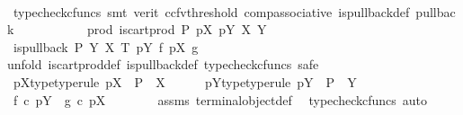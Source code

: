 \begin{isabellebody}
\ \ \ \ \ \ \ \ \isamarkupfalse%
\ {\isacharparenleft}{\kern0pt}typecheck{\isacharunderscore}{\kern0pt}cfuncs{\isacharcomma}{\kern0pt}\ smt\ {\isacharparenleft}{\kern0pt}verit{\isacharcomma}{\kern0pt}\ ccfv{\isacharunderscore}{\kern0pt}threshold{\isacharparenright}{\kern0pt}\ comp{\isacharunderscore}{\kern0pt}associative{}\ is{\isacharunderscore}{\kern0pt}pullback{\isacharunderscore}{\kern0pt}def\ pullback{\isacharparenright}{\kern0pt}\isanewline
\ \ \ \ \isamarkupfalse%
\isanewline
\ \ \isamarkupfalse%
\isanewline
{}\isamarkupfalse%
\isanewline
\ \ \isamarkupfalse%
\ prod{\isacharcolon}{\kern0pt}\ {\isachardoublequoteopen}is{\isacharunderscore}{\kern0pt}cart{\isacharunderscore}{\kern0pt}prod\ P\ pX\ pY\ X\ Y{\isachardoublequoteclose}\isanewline
\ \ \isamarkupfalse%
\ \isamarkupfalse%
\ {\isachardoublequoteopen}is{\isacharunderscore}{\kern0pt}pullback\ P\ Y\ X\ T\ pY\ f\ pX\ g{\isachardoublequoteclose}\isanewline
\ \ \isamarkupfalse%
{\isacharparenleft}{\kern0pt}unfold\ is{\isacharunderscore}{\kern0pt}cart{\isacharunderscore}{\kern0pt}prod{\isacharunderscore}{\kern0pt}def\ is{\isacharunderscore}{\kern0pt}pullback{\isacharunderscore}{\kern0pt}def{\isacharcomma}{\kern0pt}\ typecheck{\isacharunderscore}{\kern0pt}cfuncs{\isacharcomma}{\kern0pt}\ safe{\isacharparenright}{\kern0pt}\isanewline
\ \ \ \ \isamarkupfalse%
\ pX{\isacharunderscore}{\kern0pt}type{\isacharbrackleft}{\kern0pt}type{\isacharunderscore}{\kern0pt}rule{\isacharbrackright}{\kern0pt}{\isacharcolon}{\kern0pt}\ {\isachardoublequoteopen}pX\ {\isacharcolon}{\kern0pt}\ P\ {\isasymrightarrow}\ X{\isachardoublequoteclose}\isanewline
\ \ \ \ \isamarkupfalse%
\ pY{\isacharunderscore}{\kern0pt}type{\isacharbrackleft}{\kern0pt}type{\isacharunderscore}{\kern0pt}rule{\isacharbrackright}{\kern0pt}{\isacharcolon}{\kern0pt}\ {\isachardoublequoteopen}pY\ {\isacharcolon}{\kern0pt}\ P\ {\isasymrightarrow}\ Y{\isachardoublequoteclose}\isanewline
\ \ \ \ \isamarkupfalse%
\ {\isachardoublequoteopen}f\ {\isasymcirc}\isactrlsub c\ pY\ {\isacharequal}{\kern0pt}\ g\ {\isasymcirc}\isactrlsub c\ pX{\isachardoublequoteclose}\isanewline
\ \ \ \ \ \ \isamarkupfalse%
\ assms{\isacharparenleft}{\kern0pt}{}{\isacharparenright}{\kern0pt}\ terminal{\isacharunderscore}{\kern0pt}object{\isacharunderscore}{\kern0pt}def\ \isamarkupfalse%
\ {\isacharparenleft}{\kern0pt}typecheck{\isacharunderscore}{\kern0pt}cfuncs{\isacharcomma}{\kern0pt}\ auto{\isacharparenright}{\kern0pt}\ \ \isanewline

\end{isabellebody}
